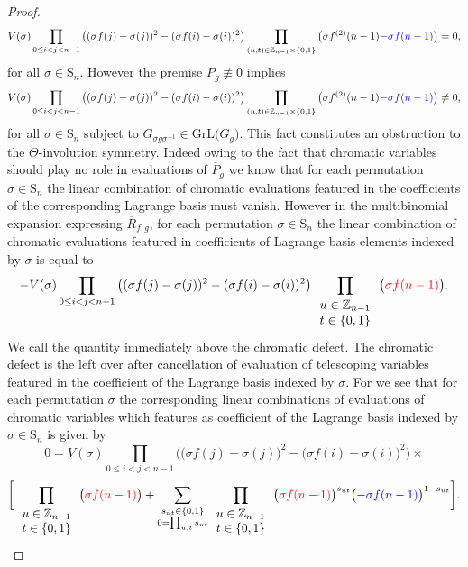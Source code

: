 \begin{proof}
\[
V(\sigma)\prod_{0\le i<j<n-1}\big((\sigma f(j)-\sigma(j))^{2}-(\sigma f(i)-\sigma(i))^{2}\big)\prod_{(u,t)\in\mathbb{Z}_{n-1}\times\{0,1\}}\big(\sigma f^{(2)}(n-1){\color{blue}-\sigma f(n-1)}\big)=0,
\]
for all $\sigma\in\text{S}_{n}$. However the premise $P_{g}\not\equiv0$ implies
\[
V(\sigma)\prod_{0\le i<j<n-1}\big((\sigma f(j)-\sigma(j))^{2}-(\sigma f(i)-\sigma(i))^{2}\big)\prod_{(u,t)\in\mathbb{Z}_{n-1}\times\{0,1\}}\big(\sigma f^{(2)}(n-1){\color{blue}-\sigma f(n-1)}\big)\ne0,
\]
for all $\sigma\in\text{S}_{n}$ subject to $G_{\sigma g\sigma^{-1}}\in\text{GrL}\big(G_{g}\big)$. This fact constitutes an obstruction to the $\Theta$-involution symmetry. Indeed owing to the fact that chromatic variables should play no role in evaluations of $\overline{P}_{g}$ we know that for each permutation $\sigma\in\text{S}_{n}$ the linear combination of chromatic evaluations featured in the coefficients of the corresponding Lagrange basis must vanish.
However in the multibinomial expansion expressing $\overline{R}_{f,g}$, for each permutation $\sigma\in\text{S}_{n}$ the linear combination of chromatic evaluations featured in coefficients of Lagrange basis elements indexed by $\sigma$ is equal to
\[
-V(\sigma)\prod_{0\le i<j<n-1}\big((\sigma f(j)-\sigma(j))^{2}-(\sigma f(i)-\sigma(i))^{2}\big)\prod_{\begin{array}{c}
u\in\mathbb{Z}_{n-1}\\
t\in\{0,1\}
\end{array}}\big({\color{red}\sigma f(n-1)}\big).
\]
We call the quantity immediately above the chromatic defect. The chromatic defect is the left over after cancellation of evaluation of telescoping variables featured in the coefficient of the Lagrange basis indexed by $\sigma$. For we see that for each permutation $\sigma$ the corresponding linear combinations of evaluations of chromatic variables which features as coefficient of the Lagrange basis indexed by $\sigma\in\text{S}_{n}$ is given by
\[
0=V(\sigma)\prod_{0\le i<j<n-1}\bigg(\big(\sigma f(j)-\sigma(j)\big)^{2}-\big(\sigma f(i)-\sigma(i)\big)^{2}\bigg)\times
\]
\[
\bigg[\prod_{\begin{array}{c}
u\in\mathbb{Z}_{n-1}\\
t\in\{0,1\}
\end{array}}\big({\color{red}\sigma f(n-1)}\big)+\sum_{\substack{s_{ut}\in\{0,1\}\\
0=\prod_{u,t}s_{ut}
}
}\prod_{\begin{array}{c}
u\in\mathbb{Z}_{n-1}\\
t\in\{0,1\}
\end{array}}\big({\color{red}\sigma f(n-1)}\big)^{s_{ut}}\big({\color{blue}-\sigma f(n-1)}\big)^{1-s_{ut}}\bigg].
\]
\end{proof}
